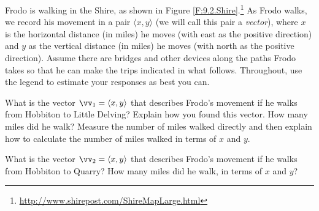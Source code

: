\begin{pa} \label{PA:9.2}
Frodo is walking in the Shire, as shown in Figure \ref{F:9.2.Shire}.\footnote{\url{http://www.shirepost.com/ShireMapLarge.html}} As Frodo walks, we record his movement in a pair $\langle x, y \rangle$ (we will call this pair a \emph{vector}), where $x$ is the horizontal distance (in miles) he moves (with east as the positive direction) and $y$ as the vertical distance (in miles) he moves (with north as the positive direction). Assume there are bridges and other devices along the paths Frodo takes so that he can make the trips indicated in what follows. Throughout, use the legend to estimate your responses as best you can.

    \ba
    \item What is the vector $\vv_1 = \langle x , y \rangle$ that describes Frodo's movement if he walks from Hobbiton to Little Delving? Explain how you found this vector. How many miles did he walk? Measure the number of miles walked directly and then explain how to calculate the number of miles walked in terms of $x$ and $y$.

\begin{comment}

\as

\solution Using a marked straightedge, the horizontal distance from Hobbiton to Little Delving is approximately 18 miles, while the vertical distance is about 3.75 miles. Since the hobbit traveled west and north, the vector describing their movement is ${\vv_1 = \langle -18, 3.75 \rangle}$. The straight line distance from Hobbiton to Little Delving is measured as approximately 18.5 miles, and this can be found using the Pythagorean Theorem on the right triangle with $x$ and $y$ as legs and the distance from Hobbiton to Little Delving as the hypotenuse. This gives the straight line distance from Hobbiton to Little Delving as
\[\sqrt{(-18)^2 + (3.75)^2} \approx 18.38.\]
Of course, there is error here in all of the measurements.

\as

\end{comment}

    \item What is the vector $\vv_2 = \langle x , y \rangle$ that describes Frodo's movement if he walks from Hobbiton to Quarry? How many miles did he walk, in terms of $x$ and $y$?

\begin{comment}

\as


\end{comment}
\end{pa}

